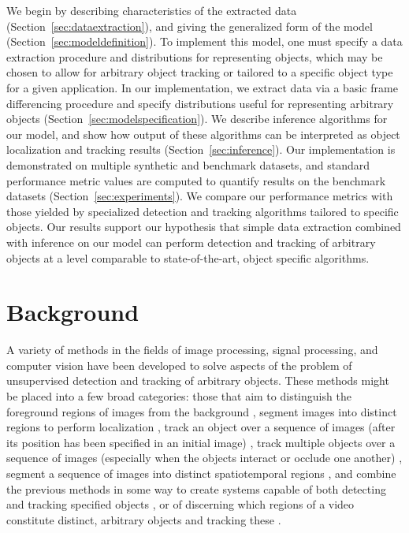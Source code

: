 \documentclass{article}
\begin{document}
We begin by describing characteristics of the extracted data (Section~\ref{sec:dataextraction}), and giving the generalized form of the model (Section~\ref{sec:modeldefinition}). To implement this model, one must specify a data extraction procedure and distributions for representing objects, which may be chosen to allow for arbitrary object tracking or tailored to a specific object type for a given application. In our implementation, we extract data via a basic frame differencing procedure and specify distributions useful for representing arbitrary objects (Section~\ref{sec:modelspecification}). We describe inference algorithms for our model, and show how output of these algorithms can be interpreted as object localization and tracking results (Section~\ref{sec:inference}). Our implementation is demonstrated on multiple synthetic and benchmark datasets, and standard performance metric values are computed to quantify results on the benchmark datasets (Section~\ref{sec:experiments}). We compare our performance metrics with those yielded by specialized detection and tracking algorithms tailored to specific objects. Our results support our hypothesis that simple data extraction combined with inference on our model can perform detection and tracking of arbitrary objects at a level comparable to state-of-the-art, object specific algorithms.




\section{Background}
\label{sec:priorwork}

A variety of methods in the fields of image processing, signal processing, and computer vision have been developed to solve aspects of the problem of unsupervised detection and tracking of arbitrary objects. These methods might be placed into a few broad categories: those that aim to distinguish the foreground regions of images from the background \cite{hong2007real,chien2002efficient, zhang2007moving, kim2002fast}, segment images into distinct regions to perform localization \cite{jain1997object, fei2005bayesian, sivic2005discovering}, track an object over a sequence of images (after its position has been specified in an initial image) \cite{raja_1998, mckenna_1999, jepson_2003, comaniciu_2003, perez_2002}, track multiple objects over a sequence of images (especially when the objects interact or occlude one another) \cite{senior2006appearance, cucchiara2004probabilistic, zhou2003background, han_2004, mckenna2000tracking, dockstader2001multiple}, segment a sequence of images into distinct spatiotemporal regions \cite{brox2003unsupervised, sista2000unsupervised, wang1998unsupervised}, and combine the previous methods in some way to create systems capable of both detecting and tracking specified objects \cite{Okuma04aboosted,eth_biwi_00633,4036928, khan_2004, leibe2008coupled}, or of discerning which regions of a video constitute distinct, arbitrary objects and tracking these \cite{brostow2006unsupervised, brox2010object, fragkiadaki2011detection, pece_2002,paragios2000geodesic}.
\end{document}
